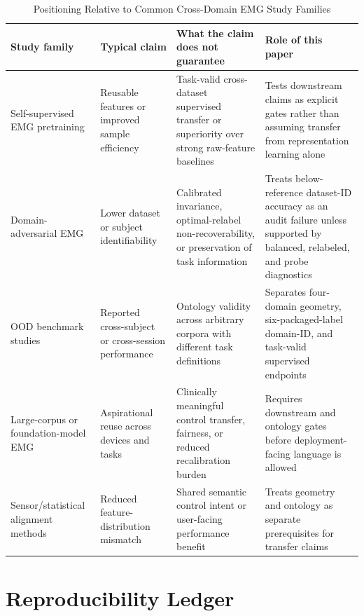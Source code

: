 \documentclass[journal]{IEEEtran}
\begin{document}
\begin{table}[!t]
\caption{Positioning Relative to Common Cross-Domain EMG Study Families}
\label{tab:s_relatedclaimmap}
\centering
\footnotesize
\begin{tabularx}{\textwidth}{@{}p{2.8cm}p{3.0cm}p{4.2cm}Y@{}}
\toprule
Study family & Typical claim & What the claim does not guarantee & Role of this paper \\
\midrule
Self-supervised EMG pretraining & Reusable features or improved sample efficiency & Task-valid cross-dataset supervised transfer or superiority over strong raw-feature baselines & Tests downstream claims as explicit gates rather than assuming transfer from representation learning alone \\
Domain-adversarial EMG & Lower dataset or subject identifiability & Calibrated invariance, optimal-relabel non-recoverability, or preservation of task information & Treats below-reference dataset-ID accuracy as an audit failure unless supported by balanced, relabeled, and probe diagnostics \\
OOD benchmark studies & Reported cross-subject or cross-session performance & Ontology validity across arbitrary corpora with different task definitions & Separates four-domain geometry, six-packaged-label domain-ID, and task-valid supervised endpoints \\
Large-corpus or foundation-model EMG & Aspirational reuse across devices and tasks & Clinically meaningful control transfer, fairness, or reduced recalibration burden & Requires downstream and ontology gates before deployment-facing language is allowed \\
Sensor/statistical alignment methods & Reduced feature-distribution mismatch & Shared semantic control intent or user-facing performance benefit & Treats geometry and ontology as separate prerequisites for transfer claims \\
\bottomrule
\end{tabularx}
\end{table}

\section{Reproducibility Ledger}
\end{document}
